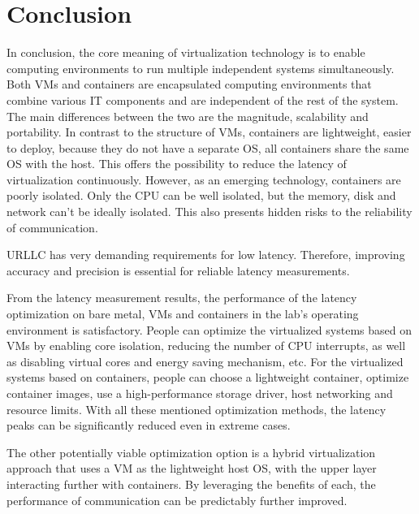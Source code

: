 \section{Conclusion}
In conclusion, the core meaning of virtualization technology is to enable computing
environments to run multiple independent systems simultaneously\cite{b18}.
Both VMs and containers are encapsulated computing environments that
combine various IT components and are independent of the rest of the system.
The main differences between the two are the magnitude, scalability and portability\cite{b15}.
In contrast to the structure of VMs, containers are lightweight, easier to deploy, because they do not
have a separate OS, all containers share the same OS with the host.
This offers the possibility to reduce the latency of virtualization continuously.
However, as an emerging technology, containers are poorly isolated.
Only the CPU can be well isolated, but the memory, disk and network can't be ideally isolated\cite{b8}.
This also presents hidden risks to the reliability of communication.

URLLC has very demanding requirements for low latency.
Therefore, improving accuracy and precision is essential for reliable latency measurements.

From the latency measurement results, the performance of the latency optimization
on bare metal, VMs and containers in the lab's operating environment is satisfactory.
People can optimize the virtualized systems based on VMs by enabling core isolation,
reducing the number of CPU interrupts, as well as disabling virtual cores and energy
saving mechanism, etc.
For the virtualized systems based on containers, people can choose a lightweight container,
optimize container images, use a high-performance storage driver, host networking and resource limits.
With all these mentioned optimization methods, the latency peaks can be significantly reduced even in extreme cases.

The other potentially viable optimization option is a hybrid virtualization approach
that uses a VM as the lightweight host OS, with the upper layer interacting
further with containers.
By leveraging the benefits of each, the performance of communication can be predictably
further improved.